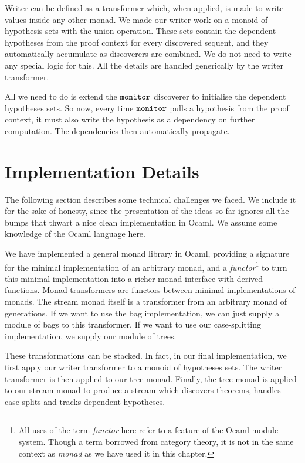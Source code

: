 Writer can be defined as a transformer which, when applied, is made to write values inside any other monad. We made our writer work on a monoid of hypothesis sets with the union operation. These sets contain the dependent hypotheses from the proof context for every discovered sequent, and they automatically accumulate as discoverers are combined. We do not need to write any special logic for this. All the details are handled generically by the writer transformer.

All we need to do is extend the $\texttt{monitor}$ discoverer to initialise the dependent hypotheses sets. So now, every time $\texttt{monitor}$ pulls a hypothesis from the proof context, it must also write the hypothesis as a dependency on further computation. The dependencies then automatically propagate.

\section{Implementation Details}
The following section describes some technical challenges we faced. We include it for the sake of honesty, since the presentation of the ideas so far ignores all the bumps that thwart a nice clean implementation in Ocaml. We assume some knowledge of the Ocaml language here.

We have implemented a general monad library in Ocaml, providing a signature for the minimal implementation of an arbitrary monad, and a \emph{functor}\footnote{All uses of the term \emph{functor} here refer to a feature of the Ocaml module system. Though a term borrowed from category theory, it is not in the same context as \emph{monad} as we have used it in this chapter.} to turn this minimal implementation into a richer monad interface with derived functions. Monad transformers are functors between minimal implementations of monads. The stream monad itself is a transformer from an arbitrary monad of generations. If we want to use the bag implementation, we can just supply a module of bags to this transformer. If we want to use our case-splitting implementation, we supply our module of trees. 

These transformations can be stacked. In fact, in our final implementation, we first apply our writer transformer to a monoid of hypotheses sets. The writer transformer is then applied to our tree monad. Finally, the tree monad is applied to our stream monad to produce a stream which discovers theorems, handles case-splits and tracks dependent hypotheses.

